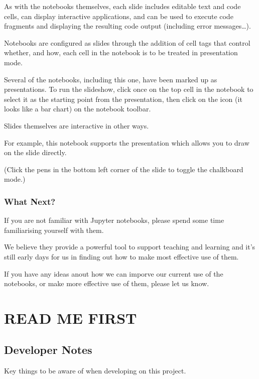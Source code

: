 \documentclass[letterpaper,10pt,english]{sphinxmanual}
\begin{document}
As with the notebooks themselves, each slide includes editable text and code cells, can display interactive applications, and can be used to execute code fragments and displaying the resulting code output (including error messages…).

Notebooks are configured as slides through the addition of cell tags that control whether, and how, each cell in the notebook is to be treated in presentation mode.

Several of the notebooks, including this one, have been marked up as presentations. To run the slideshow, click once on the top cell in the notebook to select it as the starting point from the presentation, then click on the  icon (it looks like a bar chart) on the notebook toolbar.

Slides themselves are interactive in other ways.

For example, this notebook supports the presentation  which allows you to draw on the slide directly.

(Click the pens in the bottom left corner of the slide to toggle the chalkboard mode.)


\subsubsection{What Next?}
\label{\detokenize{content/00_NOTES_FOR_TUTORS/GETTING_STARTED:What-Next?}}
If you are not familiar with Jupyter notebooks, please spend some time familiarising yourself with them.

We believe they provide a powerful tool to support teaching and learning and it’s still early days for us in finding out how to make most effective use of them.

If you have any ideas anout how we can imporve our current use of the notebooks, or make more effective use of them, please let us know.


\section{READ ME FIRST}
\label{\detokenize{index:read-me-first}}

\subsection{Developer Notes}
\label{\detokenize{content/00_READ_ME_FIRST/Section:Developer-Notes}}\label{\detokenize{content/00_READ_ME_FIRST/Section::doc}}
Key things to be aware of when developing on this project.
\end{document}
